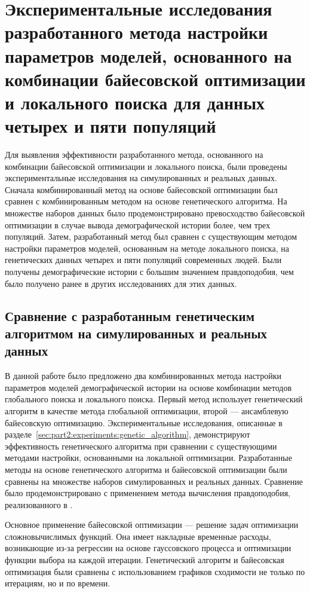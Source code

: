 \FloatBarrier
\section{Экспериментальные исследования разработанного метода настройки параметров моделей, основанного на комбинации байесовской оптимизации и локального поиска для данных четырех и пяти популяций}
\label{sec:part2:experiments:bayesian_optimization}

Для выявления эффективности разработанного метода, основанного на комбинации байесовской оптимизации и локального поиска, были проведены экспериментальные исследования на симулированных и реальных данных.
Сначала комбинированный метод на основе байесовской оптимизации был сравнен с комбинированным методом на основе генетического алгоритма.
На множестве наборов данных было продемонстрировано превосходство байесовской оптимизации в случае вывода демографической истории более, чем трех популяций.
Затем, разработанный метод был сравнен с существующим методом настройки параметров моделей, основанным на методе локального поиска, на генетических данных четырех и пяти популяций современных людей.
Были получены демографические истории с большим значением правдоподобия, чем было получено ранее в других исследованиях для этих данных.

\subsection{Сравнение с разработанным генетическим алгоритмом на симулированных и реальных данных}
\label{sec:approach:gen_comp}

В данной работе было предложено два комбинированных метода настройки параметров моделей демографической истории на основе комбинации методов глобального поиска и локального поиска.
Первый метод использует генетический алгоритм в качестве метода глобальной оптимизации, второй --- ансамблевую байесовскую оптимизацию.
Экспериментальные исследования, описанные в разделе~\ref{sec:part2:experiments:genetic_algorithm}, демонстрируют эффективность генетического алгоритма при сравнении с существующими методами настройки, основанными на локальной оптимизации.
Разработанные методы на основе генетического алгоритма и байесовской оптимизации были сравнены на множестве наборов симулированных и реальных данных.
Сравнение было продемонстрировано с применением метода вычисления правдоподобия, реализованного в \moments.

Основное применение байесовской оптимизации --- решение задач оптимизации сложновычислимых функций.
Она имеет накладные временные расходы, возникающие из-за регрессии на основе гауссовского процесса и оптимизации функции выбора на каждой итерации.
Генетический алгоритм и байесовская оптимизация были сравнены с использованием графиков сходимости не только по итерациям, но и по времени.

